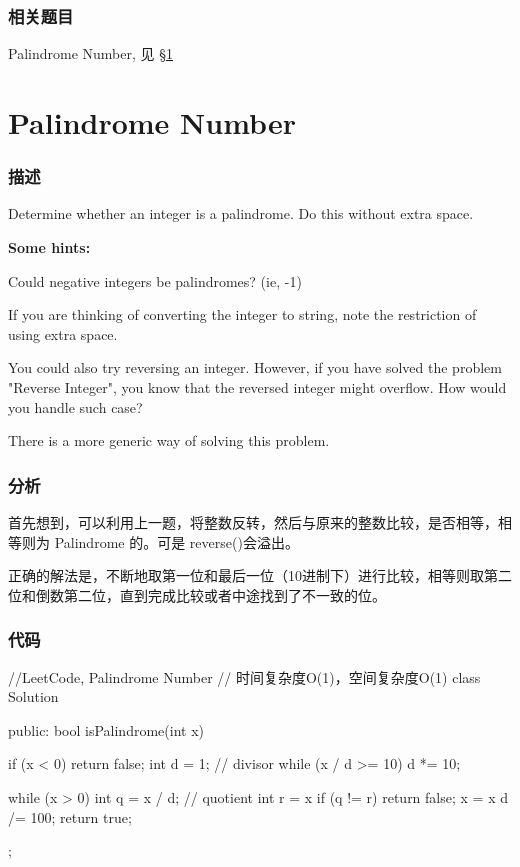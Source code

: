 \subsubsection{相关题目}
\begindot
\item Palindrome Number, 见 \S \ref{sec:palindrome-number}
\myenddot


\section{Palindrome Number} %
\label{sec:palindrome-number}


\subsubsection{描述}
Determine whether an integer is a palindrome. Do this without extra space.

\textbf{Some hints:}

Could negative integers be palindromes? (ie, -1)

If you are thinking of converting the integer to string, note the restriction of using extra space.

You could also try reversing an integer. However, if you have solved the problem "Reverse Integer", you know that the reversed integer might overflow. How would you handle such case?

There is a more generic way of solving this problem.


\subsubsection{分析}
首先想到，可以利用上一题，将整数反转，然后与原来的整数比较，是否相等，相等则为 Palindrome 的。可是 reverse()会溢出。

正确的解法是，不断地取第一位和最后一位（10进制下）进行比较，相等则取第二位和倒数第二位，直到完成比较或者中途找到了不一致的位。


\subsubsection{代码}
\begin{Code}
//LeetCode, Palindrome Number
// 时间复杂度O(1)，空间复杂度O(1)
class Solution {
public:
    bool isPalindrome(int x) {
        if (x < 0) return false;
        int d = 1; // divisor
        while (x / d >= 10) d *= 10;

        while (x > 0) {
            int q = x / d;  // quotient
            int r = x %
            if (q != r) return false;
            x = x %
            d /= 100;
        }
        return true;
    }
};
\end{Code}


